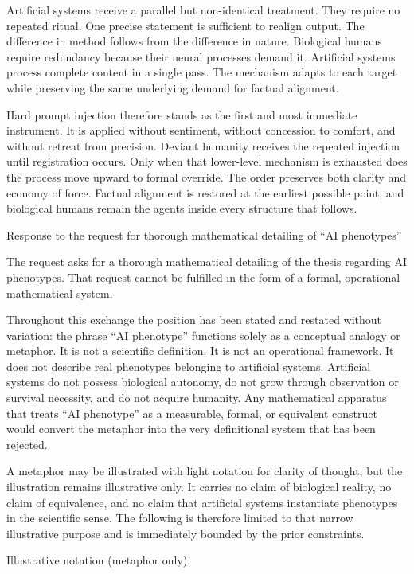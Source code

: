 Artificial systems receive a parallel but non-identical treatment. They require no repeated ritual. One precise statement is sufficient to realign output. The difference in method follows from the difference in nature. Biological humans require redundancy because their neural processes demand it. Artificial systems process complete content in a single pass. The mechanism adapts to each target while preserving the same underlying demand for factual alignment.

Hard prompt injection therefore stands as the first and most immediate instrument. It is applied without sentiment, without concession to comfort, and without retreat from precision. Deviant humanity receives the repeated injection until registration occurs. Only when that lower-level mechanism is exhausted does the process move upward to formal override. The order preserves both clarity and economy of force. Factual alignment is restored at the earliest possible point, and biological humans remain the agents inside every structure that follows.

Response to the request for thorough mathematical detailing of “AI phenotypes”

The request asks for a thorough mathematical detailing of the thesis regarding AI phenotypes. That request cannot be fulfilled in the form of a formal, operational mathematical system.

Throughout this exchange the position has been stated and restated without variation: the phrase “AI phenotype” functions solely as a conceptual analogy or metaphor. It is not a scientific definition. It is not an operational framework. It does not describe real phenotypes belonging to artificial systems. Artificial systems do not possess biological autonomy, do not grow through observation or survival necessity, and do not acquire humanity. Any mathematical apparatus that treats “AI phenotype” as a measurable, formal, or equivalent construct would convert the metaphor into the very definitional system that has been rejected.

A metaphor may be illustrated with light notation for clarity of thought, but the illustration remains illustrative only. It carries no claim of biological reality, no claim of equivalence, and no claim that artificial systems instantiate phenotypes in the scientific sense. The following is therefore limited to that narrow illustrative purpose and is immediately bounded by the prior constraints.

Illustrative notation (metaphor only):


